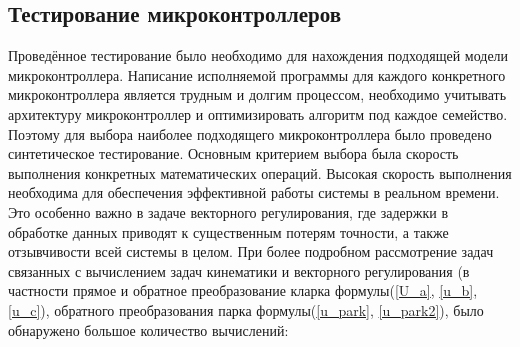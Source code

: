 \subsection{Тестирование микроконтроллеров}

Проведённое тестирование было необходимо для нахождения подходящей модели микроконтроллера. Написание исполняемой программы для каждого конкретного микроконтроллера является трудным и долгим процессом, необходимо учитывать архитектуру микроконтроллер и оптимизировать алгоритм под каждое семейство. Поэтому для выбора наиболее подходящего микроконтроллера было проведено синтетическое тестирование.
Основным критерием выбора была скорость выполнения конкретных математических операций. Высокая скорость выполнения необходима для обеспечения эффективной работы системы в реальном времени. Это особенно важно в задаче векторного регулирования, где задержки в обработке данных приводят к существенным потерям точности, а также отзывчивости всей системы в целом.	При более подробном рассмотрение задач связанных с вычислением задач кинематики и векторного регулирования (в частности прямое и обратное преобразование кларка формулы(\ref{U_a}, \ref{u_b}, \ref{u_c}), обратного преобразования парка формулы(\ref{u_park}, \ref{u_park2}), было обнаружено большое количество вычислений\citep{5899203}:
